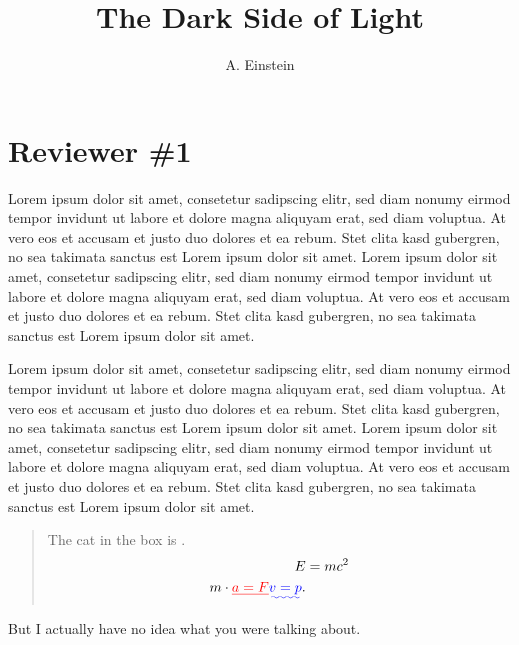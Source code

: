 \documentclass{response}
\title{The Dark Side of Light}
\author{A. Einstein}
\begin{document}
\maketitle


\section{Reviewer \#1}

\begin{reviewer}
  Lorem ipsum dolor sit amet, consetetur sadipscing elitr, sed diam nonumy
  eirmod tempor invidunt ut labore et dolore magna aliquyam erat, sed diam
  voluptua. At vero eos et accusam et justo duo dolores et ea rebum. Stet clita
  kasd gubergren, no sea takimata sanctus est Lorem ipsum dolor sit amet. Lorem
  ipsum dolor sit amet, consetetur sadipscing elitr, sed diam nonumy eirmod
  tempor invidunt ut labore et dolore magna aliquyam erat, sed diam voluptua. At
  vero eos et accusam et justo duo dolores et ea rebum. Stet clita kasd
  gubergren, no sea takimata sanctus est Lorem ipsum dolor sit amet.
\end{reviewer}

\begin{reviewer}
  Lorem ipsum dolor sit amet, consetetur sadipscing elitr, sed diam nonumy
  eirmod tempor invidunt ut labore et dolore magna aliquyam erat, sed diam
  voluptua. At vero eos et accusam et justo duo dolores et ea rebum. Stet clita
  kasd gubergren, no sea takimata sanctus est Lorem ipsum dolor sit amet. Lorem
  ipsum dolor sit amet, consetetur sadipscing elitr, sed diam nonumy eirmod
  tempor invidunt ut labore et dolore magna aliquyam erat, sed diam voluptua. At
  vero eos et accusam et justo duo dolores et ea rebum. Stet clita kasd
  gubergren, no sea takimata sanctus est Lorem ipsum dolor sit amet.
\end{reviewer}


\begin{quote}
The cat in the box is \DIFdelbegin {}\DIFdelend \DIFaddbegin {}\DIFaddend .
\begin{align}
E &= mc^2 \\
m\cdot \DIFdelbegin \DIFdel{a=F}\DIFdelend \DIFaddbegin \DIFadd{v=p}\DIFaddend .
\end{align}
\end{quote}

But I actually have no idea what you were talking about.
\end{document}
